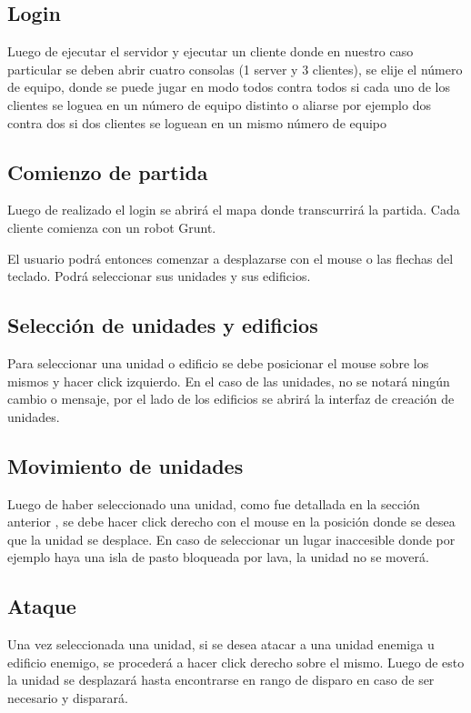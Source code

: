 \subsection{Login}
    Luego de ejecutar el servidor y ejecutar un cliente donde en nuestro caso
    particular se deben abrir cuatro consolas (1 server y 3 clientes), se elije
    el número de equipo, donde se puede jugar en modo todos contra todos si cada
    uno de los clientes se loguea en un número de equipo distinto o aliarse por
    ejemplo dos contra dos si dos clientes se loguean en un mismo número de equipo
    \def\path{Login.jpg}
    \def\scale{.6}
    \def\text{Login}
    
\subsection{Comienzo de partida}
    Luego de realizado el login se abrirá el mapa donde transcurrirá la partida.
    Cada cliente comienza con un robot Grunt.
    \def\path{Inicio.png}
    \def\scale{.6}
    \def\text{inicio}
    
    El usuario podrá entonces comenzar a desplazarse con el mouse o las flechas
    del teclado. Podrá seleccionar sus unidades y sus edificios.
\subsection{Selección de unidades y edificios}
    Para seleccionar una unidad o edificio se debe posicionar el mouse sobre los
    mismos y hacer click izquierdo. En el caso de las unidades, no se notará ningún
    cambio o mensaje, por el lado de los edificios se abrirá la interfaz de creación
    de unidades.
    \def\path{Seleccion.png}
    \def\scale{.6}
    \def\text{seleccion}
    
\subsection{Movimiento de unidades}
    Luego de haber seleccionado una unidad, como fue detallada en la sección
    anterior , se debe hacer click derecho con el mouse en la posición donde se
    desea que la unidad se desplace. En caso de seleccionar un lugar inaccesible
    donde por ejemplo haya una isla de pasto bloqueada por lava, la unidad no se
    moverá.
    \def\path{Movimiento.png}
    \def\scale{.6}
    \def\text{Movimiento}
    
\subsection{Ataque}
    Una vez seleccionada una unidad, si se desea atacar a una unidad enemiga u
    edificio enemigo, se procederá a hacer click derecho sobre el mismo. Luego de
    esto la unidad se desplazará hasta encontrarse en rango de disparo en caso de
    ser necesario y disparará.
    \def\path{Disparo1.png}
    \def\scale{.6}
    \def\text{Disparo}
    


